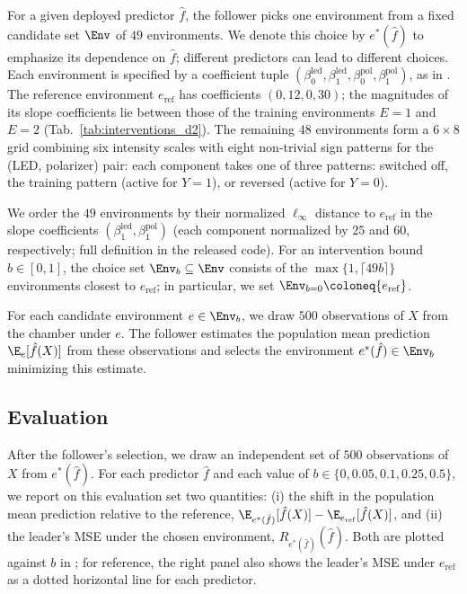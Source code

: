 For a given deployed predictor $\hat{f}$, the follower picks one environment from a fixed candidate set $\Env$ of $49$ environments. We denote this choice by $e^*(\hat{f})$ to emphasize its dependence on $\hat{f}$; different predictors can lead to different choices. Each environment is specified by a coefficient tuple $(\beta^{\mathrm{led}}_0, \beta^{\mathrm{led}}_1, \beta^{\mathrm{pol}}_0, \beta^{\mathrm{pol}}_1)$, as in . The reference environment $e_\mathrm{ref}$ has coefficients $(0, 12, 0, 30)$; the magnitudes of its slope coefficients lie between those of the training environments $E = 1$ and $E = 2$ (Tab.~\ref{tab:interventions_d2}). The remaining $48$ environments form a $6 \times 8$ grid combining six intensity scales with eight non-trivial sign patterns for the (LED, polarizer) pair: each component takes one of three patterns: switched off, the training pattern (active for $Y = 1$), or reversed (active for $Y = 0$).
 
We order the $49$ environments by their normalized $\ell_\infty$ distance to $e_\mathrm{ref}$ in the slope coefficients $(\beta^{\mathrm{led}}_1, \beta^{\mathrm{pol}}_1)$ (each component normalized by $25$ and $60$, respectively; full definition in the released code). For an intervention bound $b \in [0, 1]$, the choice set $\Env_b \subseteq \Env$ consists of the $\max\{1,\lceil 49 b \rceil\}$ environments closest to $e_\mathrm{ref}$; in particular, we set $\Env_{b=0} \coloneq \{e_\mathrm{ref}\}$.
 
For each candidate environment $e \in \Env_b$, we draw $500$ observations of $X$ from the chamber under $e$. The follower estimates the population mean prediction $\E_e[\hat{f}(X)]$ from these observations and selects the environment $e^*(\hat{f}) \in \Env_b$ minimizing this estimate.


\subsection{Evaluation} \label{app:evaluation_causal_chambers}


After the follower's selection, we draw an independent set of $500$ observations of $X$ from $e^*(\hat{f})$. For each predictor $\hat{f}$ and each value of $b \in \{0, 0.05, 0.1, 0.25, 0.5\}$, we report on this evaluation set two quantities: (i) the shift in the population mean prediction relative to the reference, $\E_{e^*(\hat{f})}[\hat{f}(X)] - \E_{e_\mathrm{ref}}[\hat{f}(X)]$, and (ii) the leader's MSE under the chosen environment, $R_{e^*(\hat{f})}(\hat{f})$. Both are plotted against $b$ in ; for reference, the right panel also shows the leader's MSE under $e_\mathrm{ref}$ as a dotted horizontal line for each predictor.


